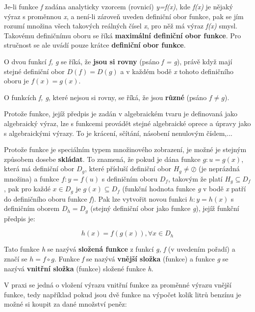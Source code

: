 
Je-li funkce {\it f} zadána analyticky vzorcem (rovnicí) {\it y=f(x)}, kde {\it f(x)} je nějaký výraz s proměnnou {\it x}, a není-li zároveň uveden definiční obor funkce, pak se jím rozumí množina všech takových reálných čísel {\it x}, pro něž má výraz {\it f(x)} smysl. Takovému definičnímu oboru se říká {\bf maximální definiční obor funkce}. Pro stručnost se ale uvádí pouze krátce {\bf definiční obor funkce}. 


O dvou funkcí {\it f, g} se říká, že {\bf jsou si rovny} (psáno {\it f = g}), právě když mají stejné definiční obor $D(f) = D(g)$ a v každém bodě {\it x} tohoto definičního oboru je $f(x) = g(x)$.

O funkcích {\it f, g}, které nejsou si rovny, se říká, že jsou {\bf různé} (psáno $f\neq g$).


Protože funkce, jejíž předpis je zadán v algebraickém tvaru je definovaná jako algebraický výraz, lze s funkcemi provádět stejné algebraické oprece a úpravy jako s algebraickými výrazy. To je krácení, sčítání, násobení nenulovým číslem,...


Protože funkce je speciálním typem množinového zobrazení, je možné je stejným způsobem dosebe {\bf skládat}. To znamená, že pokud je dána funkce $g:u=g(x)$, která má definiční obor $D_g$, které přísluší definiční obor $H_g \neq \oslash$ (je neprázdná množina) a funkce $f:y = f(u)$ s definičním oboru $D_f$, takovým že platí $H_g \subseteq D_f$, pak pro každé $x \in D_g$ je $g(x) \subseteq D_f$ (funkční hodnota funkce {\it g} v bodě {\it x} patří do definičního oboru funkce {\it f}). Pak lze vytvořit novou funkci $ h:y = h(x) $ s definičním oborem $D_h = D_g$ (stejný definiční obor jako funkce {\it g}), jejíž funkční předpis je:

$$ h(x) = f(g(x)), \forall x \in D_h $$ 

Tato funkce {\it h} se nazývá {\bf složená funkce} z funkcí {\it g, f} (v uvedením pořadí) a značí se $h=f \circ g$. Funkce {\it f} se nazývá {\bf vnější složka} (funkce) a funkce {\it g} se nazývá {\bf vnitřní složka} (funkce) složené funkce {\it h}.

V praxi se jedná o vložení výrazu vnitřní funkce za proměnné výrazu vnější funkce, tedy například pokud jsou dvě funkce na výpočet kolik litrů benzínu je možné si koupit za dané množství peněz:

